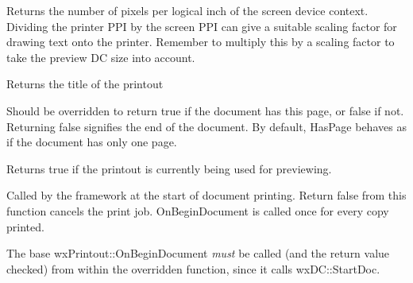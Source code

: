 
\label{wxprintoutgetppiscreen}


Returns the number of pixels per logical inch of the screen device context.
Dividing the printer PPI by the screen PPI can give a suitable scaling
factor for drawing text onto the printer. Remember to multiply
this by a scaling factor to take the preview DC size into account.

\label{wxprintoutgettitle}


Returns the title of the printout



\label{wxprintouthaspage}


Should be overridden to return true if the document has this page, or false
if not. Returning false signifies the end of the document. By default,
HasPage behaves as if the document has only one page.

\label{wxprintoutispreview}


Returns true if the printout is currently being used for previewing.

\label{wxprintoutonbegindocument}


Called by the framework at the start of document printing. Return false from
this function cancels the print job. OnBeginDocument is called once for every
copy printed.

The base wxPrintout::OnBeginDocument {\it must} be called (and the return value
checked) from within the overridden function, since it calls wxDC::StartDoc.


